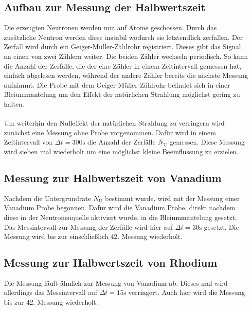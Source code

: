 \subsection{Aufbau zur Messung der Halbwertszeit}

Die erzeugten Neutronen werden nun auf Atome geschossen.
Durch das zusätzliche Neutron werden diese instabil wodurch sie letztendlich zerfallen.
Der Zerfall wird durch ein Geiger-Müller-Zählrohr registriert.
Dieses gibt das Signal an einen von zwei Zählern weiter.
Die beiden Zähler wechseln periodisch.
So kann die Anzahl der Zerfälle, die der eine Zähler in einem Zeitintervall gemessen hat, einfach abgelesen werden, während der andere Zähler bereits die nächste Messung aufnimmt.
Die Probe mit dem Geiger-Müller-Zählrohr befindet sich in einer Bleiummantelung um den Effekt der natürlichen Strahlung möglichst gering zu halten.
\\\\
Um weiterhin den Nulleffekt der natürlichen Strahlung zu verringern wird zunächst eine Messung ohne Probe vorgenommen.
Dafür wird in einem Zeitintervall von $\Delta t=300\si{\second}$ die Anzahl der Zerfälle $N_\text{U}$ gemessen.
Diese Messung wird sieben mal wiederholt um eine möglichst kleine Beeinflussung zu erzielen.

\subsection{Messung zur Halbwertszeit von Vanadium}

Nachdem die Untergrundrate $N_\text{U}$ bestimmt wurde, wird mit der Messung einer Vanadium Probe begonnen.
Dafür wird die Vanadium Probe, direkt nachdem diese in der Neutronenquelle aktiviert wurde, in die Bleiummantelung gesetzt.
Das Messintervall zur Messung der Zerfälle wird hier auf $\Delta t=30\si{\second}$ gesetzt.
Die Messung wird bis zur einschließlich 42. Messung wiederholt.

\subsection{Messung zur Halbwertszeit von Rhodium}

Die Messung läuft ähnlich zur Messung von Vanadium ab.
Dieses mal wird allerdings das Messintervall auf $\Delta t = 15\si{\second}$ verringert.
Auch hier wird die Messung bis zur 42. Messung wiederholt.